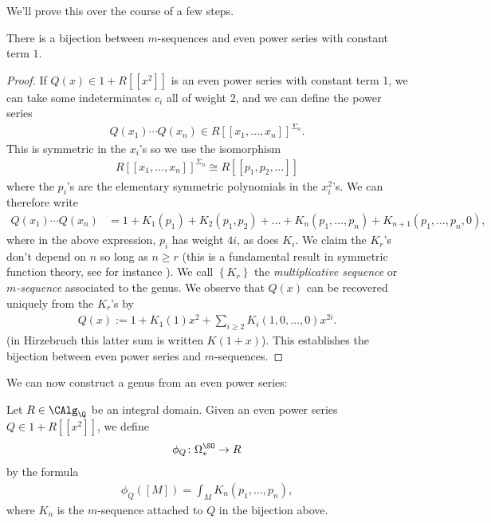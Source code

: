\documentclass[11pt]{book}
\begin{document}
We'll prove this over the course of a few steps. 

\begin{lemma} There is a bijection between $m$-sequences and even power series with constant term $1$.
\end{lemma}
\begin{proof} If $Q(x) \in 1 + R[[x^2]]$ is an even power series with constant term 1, we can take some indeterminates $c_i$ all of weight 2, and we can define the power series
\begin{align*}
    Q(x_1) \cdots Q(x_n) \in R[[x_1, \ldots, x_n]]^{\Sigma_n}.
\end{align*}
This is symmetric in the $x_i$'s so we use the isomorphism
\begin{align*}
    R[[x_1, \ldots, x_n]]^{\Sigma_n} \cong R[[p_1,p_2, \ldots]]
\end{align*}
where the $p_i$'s are the elementary symmetric polynomials in the $x_i^2$'s. We can therefore write
\begin{align*}
    Q(x_1) \cdots Q(x_n) &= 1 + K_1(p_1) + K_2(p_1,p_2) + \ldots + K_n(p_1, \ldots, p_n) + K_{n+1}(p_1, \ldots, p_n,0),
\end{align*}
where in the above expression, $p_i$ has weight $4i$, as does $K_i$. We claim the $K_r$'s don't depend on $n$ so long as $n\ge r$ (this is a fundamental result in symmetric function theory, see for instance \cite[I.2]{macdonaldSymmetricFunctionsHall1995}). We call $\left\{ K_r \right\}$ the \emph{multiplicative sequence} or $m$\emph{-sequence} associated to the genus. We observe that $Q(x)$ can be recovered uniquely from the $K_r$'s by
\begin{equation}\label{eqn:Qx-from-Krs}
\begin{aligned}
    Q(x) := 1 + K_1(1)x^2 + \sum_{i\ge 2} K_i(1,0, \ldots, 0) x^{2i}.
\end{aligned}
\end{equation}
(in Hirzebruch this latter sum is written $K(1+x)$). This establishes the bijection between even power series and $m$-sequences.
\end{proof}

We can now construct a genus from an even power series:

\begin{construction} Let $R \in \CAlg_\Q$ be an integral domain. Given an even power series $Q \in 1 + R[[x^2]]$, we define
\begin{align*}
    \phi_Q \colon \Omega^\SO_\ast \to R
\end{align*}
by the formula
\begin{align*}
    \phi_Q([M]) = \int_M  K_n(p_1, \ldots, p_n),
\end{align*}
where $K_n$ is the $m$-sequence attached to $Q$ in the bijection above.
\end{construction}
\end{document}
